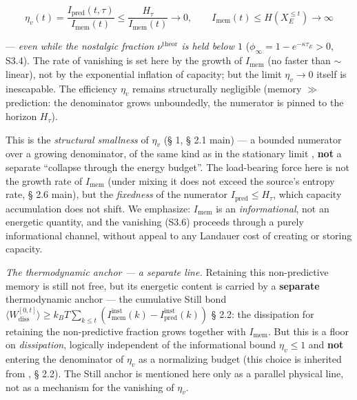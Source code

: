 \documentclass[12pt]{iopart}
\begin{document}
\begin{equation}\eta_v(t) = \frac{I_{\text{pred}}(t,\tau)}{I_{\text{mem}}(t)} \le \frac{H_\tau}{I_{\text{mem}}(t)} \to 0, \qquad I_{\text{mem}}(t) \le H(X_E^{\le t}) \to \infty \tag{S3.6}\end{equation}



--- \emph{even while the nostalgic fraction \(\nu^{\text{theor}}\) is held below \(1\)} (\(\phi_\infty = 1-e^{-\kappa\tau_E} > 0\), S3.4). The rate of vanishing is set here by the growth of \(I_{\text{mem}}\) (no faster than \(\sim\)linear), not by the exponential inflation of capacity; but the limit \(\eta_v \to 0\) itself is inescapable. The efficiency \(\eta_v\) remains structurally negligible (memory \(\gg\) prediction: the denominator grows unboundedly, the numerator is pinned to the horizon \(H_\tau\)).



This is the \emph{structural smallness} of \(\eta_v\) (§ 1, § 2.1 main) --- a bounded numerator over a growing denominator, of the same kind as in the stationary limit \cite{Andriishin2026b}, \textbf{not} a separate ``collapse through the energy budget''. The load-bearing force here is not the growth rate of \(I_{\text{mem}}\) (under mixing it does not exceed the source's entropy rate, § 2.6 main), but the \emph{fixedness} of the numerator \(I_{\text{pred}} \le H_\tau\), which capacity accumulation does not shift. We emphasize: \(I_{\text{mem}}\) is an \emph{informational}, not an energetic quantity, and the vanishing (S3.6) proceeds through a purely informational channel, without appeal to any Landauer cost of creating or storing capacity.



\emph{The thermodynamic anchor --- a separate line.} Retaining this non-predictive memory is still not free, but its energetic content is carried by a \textbf{separate} thermodynamic anchor --- the cumulative Still bond \(\langle W_{\text{diss}}^{[0,t]}\rangle \ge k_B T\sum_{k\le t}(I_{\text{mem}}^{\text{inst}}(k) - I_{\text{pred}}^{\text{inst}}(k))\) \cite{Still2012,Andriishin2026b} § 2.2: the dissipation for retaining the non-predictive fraction grows together with \(I_{\text{mem}}\). But this is a floor on \emph{dissipation}, logically independent of the informational bound \(\eta_v \le 1\) and \textbf{not} entering the denominator of \(\eta_v\) as a normalizing budget (this choice is inherited from \cite{Andriishin2026b}, § 2.2). The Still anchor is mentioned here only as a parallel physical line, not as a mechanism for the vanishing of \(\eta_v\).
\end{document}
